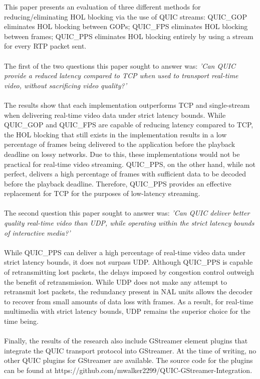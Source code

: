 \documentclass{mpaper}
\begin{document}
\noindent This paper presents an evaluation of three different methods for reducing/eliminating HOL blocking via the use of QUIC streams: QUIC\_GOP eliminates HOL blocking between GOPs; QUIC\_FPS eliminates HOL blocking between frames; QUIC\_PPS eliminates HOL blocking entirely by using a stream for every RTP packet sent.
\\\\
The first of the two questions this paper sought to answer was: \textit{'Can QUIC provide a reduced latency compared to TCP when used to transport real-time video, without sacrificing video quality?'}
\\\\
The results show that each implementation outperforms TCP and single-stream when delivering real-time video data under strict latency bounds. While QUIC\_GOP and QUIC\_FPS are capable of reducing latency compared to TCP, the HOL blocking that still exists in the implementation results in a low percentage of frames being delivered to the application before the playback deadline on lossy networks. Due to this, these implementations would not be practical for real-time video streaming. QUIC\_PPS, on the other hand, while not perfect, delivers a high percentage of frames with sufficient data to be decoded before the playback deadline. Therefore, QUIC\_PPS provides an effective replacement for TCP for the purposes of low-latency streaming.
\\\\
The second question this paper sought to answer was: \textit{'Can QUIC deliver better quality real-time video than UDP, while operating within the strict latency bounds of interactive media?'}
\\\\
While QUIC\_PPS can deliver a high percentage of real-time video data under strict latency bounds, it does not surpass UDP. Although QUIC\_PPS is capable of retransmitting lost packets, the delays imposed by congestion control outweigh the benefit of retransmission. While UDP does not make any attempt to retransmit lost packets, the redundancy present in NAL units allows the decoder to recover from small amounts of data loss with frames. As a result, for real-time multimedia with strict latency bounds, UDP remains the superior choice for the time being.
\\\\
Finally, the results of the research also include GStreamer element plugins that integrate the QUIC transport protocol into GStreamer. At the time of writing, no other QUIC plugins for GStreamer are available. The source code for the plugins can be found at https://github.com/mwalker2299/QUIC-GStreamer-Integration.
\end{document}
